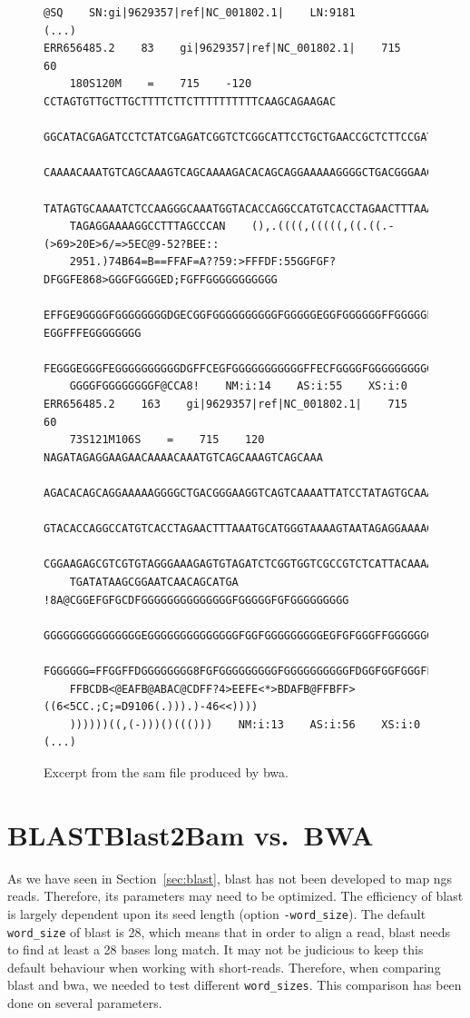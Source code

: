 \begin{figure}[H]
\begin{lstlisting}[basicstyle=\ttfamily\footnotesize,frameround=ftft,frame=trBL]
@SQ    SN:gi|9629357|ref|NC_001802.1|    LN:9181
(...)
ERR656485.2    83    gi|9629357|ref|NC_001802.1|    715    60
    180S120M    =    715    -120    CCTAGTGTTGCTTGCTTTTCTTCTTTTTTTTTTCAAGCAGAAGAC
    GGCATACGAGATCCTCTATCGAGATCGGTCTCGGCATTCCTGCTGAACCGCTCTTCCGATCTAAGATAGAGGAAGAA
    CAAAACAAATGTCAGCAAAGTCAGCAAAAGACACAGCAGGAAAAAGGGGCTGACGGGAAGGTCAGTCAAAATTATCC
    TATAGTGCAAAATCTCCAAGGGCAAATGGTACACCAGGCCATGTCACCTAGAACTTTAAATGCATGGGTAAAAGTAA
    TAGAGGAAAAGGCCTTTAGCCCAN    (),.((((,(((((,((.((.-(>69>20E>6/=>5EC@9-52?BEE::
    2951.)74B64=B==FFAF=A??59:>FFFDF:55GGFGF?DFGGFE868>GGGFGGGGED;FGFFGGGGGGGGGGG
    EFFGE9GGGGFGGGGGGGGDGECGGFGGGGGGGGGGFGGGGGEGGFGGGGGGFFGGGGGFF?EGGFFFEGGGGGGGG
    FEGGGEGGGFEGGGGGGGGGGDGFFCEGFGGGGGGGGGGGFFECFGGGGFGGGGGGGGGGGFCGGGGGGGGGGGGGG
    GGGGFGGGGGGGGF@CCA8!    NM:i:14    AS:i:55    XS:i:0
ERR656485.2    163    gi|9629357|ref|NC_001802.1|    715    60
    73S121M106S    =    715    120    NAGATAGAGGAAGAACAAAACAAATGTCAGCAAAGTCAGCAAA
    AGACACAGCAGGAAAAAGGGGCTGACGGGAAGGTCAGTCAAAATTATCCTATAGTGCAAAATCTCCAAGGGCAAATG
    GTACACCAGGCCATGTCACCTAGAACTTTAAATGCATGGGTAAAAGTAATAGAGGAAAAGGCCTTTAGCCCAGAGAT
    CGGAAGAGCGTCGTGTAGGGAAAGAGTGTAGATCTCGGTGGTCGCCGTCTCATTACAAAAAAAACATACACAATAAA
    TGATATAAGCGGAATCAACAGCATGA    !8A@CGGEFGFGCDFGGGGGGGGGGGGGGFGGGGGFGFGGGGGGGGG
    GGGGGGGGGGGGGGGEGGGGGGGGGGGGGGFGGFGGGGGGGGGEGFGFGGGFFGGGGGGGGFGGGGGGGGGGGGFFF
    FGGGGGG=FFGGFFDGGGGGGGG8FGFGGGGGGGGGFGGGGGGGGGGFDGGFGGFGGGFFFGFF8DFDFDFFFFFFF
    FFBCDB<@EAFB@ABAC@CDFF?4>EEFE<*>BDAFB@FFBFF>((6<5CC.;C;=D9106(.))).)-46<<))))
    ))))))((,(-)))()((()))    NM:i:13    AS:i:56    XS:i:0
(...)
\end{lstlisting}
\caption{Excerpt from the \acrshort{sam} file produced by \acrshort{bwa}.}\label{fig:samBWA}
\end{figure}


\section{BLAST\textendash{}Blast2Bam vs.~BWA}
As we have seen in Section~\ref{sec:blast}, \gls{blast} has not been developed to map \gls{ngs} reads.
Therefore, its parameters may need to be optimized.
The efficiency of \gls{blast} is largely dependent upon its seed length (option \texttt{-word\_size}).
The default \texttt{word\_size} of \gls{blast} is 28, which means that in order to align a read, \gls{blast} needs to find at least a 28 bases long match.
It may not be judicious to keep this default behaviour when working with short-reads.
Therefore, when comparing \gls{blast} and \gls{bwa}, we needed to test different \texttt{word\_sizes}.
This comparison has been done on several parameters.


